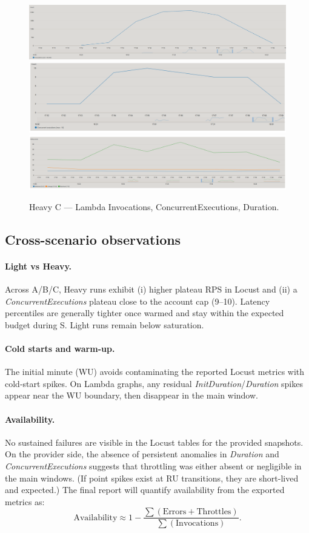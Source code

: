 \documentclass[11pt,a4paper]{article}
\begin{document}
\begin{figure}[h!] \centering
  \includegraphics[width=.32\linewidth]{"figures/hC - Invocations.png"}\hfill
  \includegraphics[width=.32\linewidth]{"figures/hC - ConcEx.png"}\hfill
  \includegraphics[width=.32\linewidth]{"figures/hC - Duration.png"}
  \caption{Heavy C --- Lambda Invocations, ConcurrentExecutions, Duration.}
\end{figure}

\subsection{Cross-scenario observations}

\paragraph{Light vs Heavy.}
Across A/B/C, Heavy runs exhibit (i) higher plateau RPS in Locust and (ii) a \emph{ConcurrentExecutions} plateau close to the account cap (9--10). Latency percentiles are generally tighter once warmed and stay within the expected budget during S. Light runs remain below saturation.

\paragraph{Cold starts and warm-up.}
The initial minute (WU) avoids contaminating the reported Locust metrics with cold-start spikes. On Lambda graphs, any residual \emph{InitDuration}/\emph{Duration} spikes appear near the WU boundary, then disappear in the main window.

\paragraph{Availability.}
No sustained failures are visible in the Locust tables for the provided snapshots. On the provider side, the absence of persistent anomalies in \emph{Duration} and \emph{ConcurrentExecutions} suggests that throttling was either absent or negligible in the main windows. (If point spikes exist at RU transitions, they are short-lived and expected.) The final report will quantify availability from the exported metrics as:
\[
\text{Availability} \approx 1 - \frac{\sum(\text{Errors} + \text{Throttles})}{\sum(\text{Invocations})}.
\]
\end{document}
